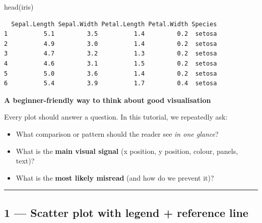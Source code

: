 \documentclass[
  letterpaper,
  DIV=11,
  numbers=noendperiod]{scrartcl}
\newenvironment{Shaded}{\begin{snugshade}}{\end{snugshade}}
\newcommand{\FunctionTok}[1]{\textcolor[rgb]{0.28,0.35,0.67}{#1}}
\newcommand{\NormalTok}[1]{\textcolor[rgb]{0.00,0.23,0.31}{#1}}
\providecommand{\tightlist}{%
  \setlength{\itemsep}{0pt}\setlength{\parskip}{0pt}}\usepackage{longtable,booktabs,array}
\begin{document}
\begin{Shaded}
\begin{Highlighting}[]
\FunctionTok{head}\NormalTok{(iris)}
\end{Highlighting}
\end{Shaded}

\begin{verbatim}
  Sepal.Length Sepal.Width Petal.Length Petal.Width Species
1          5.1         3.5          1.4         0.2  setosa
2          4.9         3.0          1.4         0.2  setosa
3          4.7         3.2          1.3         0.2  setosa
4          4.6         3.1          1.5         0.2  setosa
5          5.0         3.6          1.4         0.2  setosa
6          5.4         3.9          1.7         0.4  setosa
\end{verbatim}

\begin{tcolorbox}[enhanced jigsaw, opacitybacktitle=0.6, left=2mm, bottomrule=.15mm, coltitle=black, opacityback=0, toptitle=1mm, title=\textcolor{quarto-callout-note-color}{\faInfo}\hspace{0.5em}{Note}, colbacktitle=quarto-callout-note-color!10!white, breakable, colback=white, rightrule=.15mm, colframe=quarto-callout-note-color-frame, bottomtitle=1mm, arc=.35mm, titlerule=0mm, toprule=.15mm, leftrule=.75mm]

\textbf{A beginner-friendly way to think about good visualisation}

Every plot should answer a question. In this tutorial, we repeatedly
ask:

\begin{itemize}
\tightlist
\item
  What comparison or pattern should the reader see \emph{in one glance}?
\item
  What is the \textbf{main visual signal} (x position, y position,
  colour, panels, text)?
\item
  What is the \textbf{most likely misread} (and how do we prevent it)?
\end{itemize}

\end{tcolorbox}

\begin{center}\rule{0.5\linewidth}{0.5pt}\end{center}

\subsection{1 --- Scatter plot with legend + reference
line}\label{scatter-plot-with-legend-reference-line}
\end{document}
